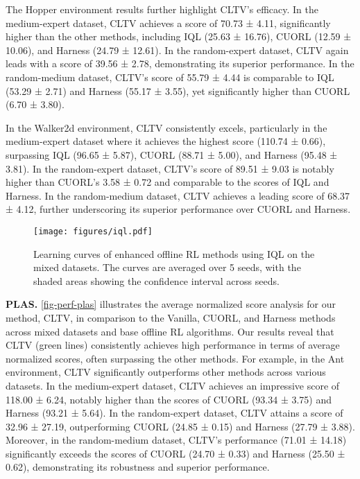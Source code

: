 The Hopper environment results further highlight CLTV’s efficacy. In the medium-expert dataset, CLTV achieves a score of 70.73 ± 4.11, significantly higher than the other methods, including IQL (25.63 ± 16.76), CUORL (12.59 ± 10.06), and Harness (24.79 ± 12.61). In the random-expert dataset, CLTV again leads with a score of 39.56 ± 2.78, demonstrating its superior performance. In the random-medium dataset, CLTV’s score of 55.79 ± 4.44 is comparable to IQL (53.29 ± 2.71) and Harness (55.17 ± 3.55), yet significantly higher than CUORL (6.70 ± 3.80).

In the Walker2d environment, CLTV consistently excels, particularly in the medium-expert dataset where it achieves the highest score (110.74 ± 0.66), surpassing IQL (96.65 ± 5.87), CUORL (88.71 ± 5.00), and Harness (95.48 ± 3.81). In the random-expert dataset, CLTV’s score of 89.51 ± 9.03 is notably higher than CUORL’s 3.58 ± 0.72 and comparable to the scores of IQL and Harness. In the random-medium dataset, CLTV achieves a leading score of 68.37 ± 4.12, further underscoring its superior performance over CUORL and Harness.



\begin{figure}[!ht]
\center
\texttt{[image: figures/iql.pdf]}
\caption{Learning curves of enhanced offline RL methods using IQL on the mixed datasets. The curves are averaged over 5 seeds, with the shaded areas showing the confidence interval across seeds.}
\label{fig-perf-iql}
\end{figure}



\textbf{PLAS.} \autoref{fig-perf-plas} illustrates the average normalized score analysis for our method, CLTV, in comparison to the Vanilla, CUORL, and Harness methods across mixed datasets and base offline RL algorithms. Our results reveal that CLTV (green lines) consistently achieves high performance in terms of average normalized scores, often surpassing the other methods. For example, in the Ant environment, CLTV significantly outperforms other methods across various datasets. In the medium-expert dataset, CLTV achieves an impressive score of 118.00 ± 6.24, notably higher than the scores of CUORL (93.34 ± 3.75) and Harness (93.21 ± 5.64). In the random-expert dataset, CLTV attains a score of 32.96 ± 27.19, outperforming CUORL (24.85 ± 0.15) and Harness (27.79 ± 3.88). Moreover, in the random-medium dataset, CLTV's performance (71.01 ± 14.18) significantly exceeds the scores of CUORL (24.70 ± 0.33) and Harness (25.50 ± 0.62), demonstrating its robustness and superior performance.

